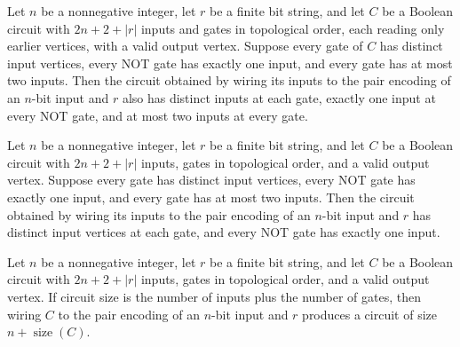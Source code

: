 \begin{theorem}
\label{BoolCircuit.DAGCircuit.pairEncode_isFaninTwo}
\leanok
{}
Let $n$ be a nonnegative integer, let $r$ be a finite bit string, and let $C$ be a
Boolean circuit with $2n+2+|r|$ inputs and gates in topological order, each reading only
earlier vertices, with a valid output vertex. Suppose every gate of $C$ has distinct
input vertices, every NOT gate has exactly one input, and every gate has at most two
inputs. Then the circuit obtained by wiring its inputs to the pair encoding of an
$n$-bit input and $r$ also has distinct inputs at each gate, exactly one input at every
NOT gate, and at most two inputs at every gate.
\end{theorem}

\begin{theorem}
\label{BoolCircuit.DAGCircuit.pairEncode_isWellFormed}
\leanok
{}
Let $n$ be a nonnegative integer, let $r$ be a finite bit string, and let $C$ be a
Boolean circuit with $2n+2+|r|$ inputs, gates in topological order, and a valid output
vertex. Suppose every gate has distinct input vertices, every NOT gate has exactly one
input, and every gate has at most two inputs. Then the circuit obtained by wiring its
inputs to the pair encoding of an $n$-bit input and $r$ has distinct input vertices at
each gate, and every NOT gate has exactly one input.
\end{theorem}

\begin{theorem}
\label{BoolCircuit.DAGCircuit.pairEncode_size}
\leanok
{}
Let $n$ be a nonnegative integer, let $r$ be a finite bit string, and let $C$ be a
Boolean circuit with $2n+2+|r|$ inputs, gates in topological order, and a valid output
vertex. If circuit size is the number of inputs plus the number of gates, then wiring
$C$ to the pair encoding of an $n$-bit input and $r$ produces a circuit of size
$n+\operatorname{size}(C)$.
\end{theorem}

